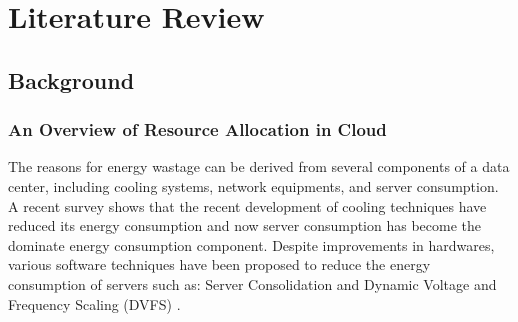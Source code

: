 \chapter{Literature Review}\label{C:background}
\section*{Background}

\subsection*{An Overview of Resource Allocation in Cloud}


The reasons for energy wastage can be derived from several components of a data center, including 
cooling systems, network equipments, and server consumption. 
A recent survey \cite{Cho:2016kz} shows that the recent development of cooling techniques 
have reduced its energy consumption and now 
server consumption has become the dominate energy consumption component.
Despite improvements in hardwares, various software techniques have been proposed 
to reduce the energy consumption of servers 
such as: Server Consolidation and Dynamic Voltage and Frequency Scaling (DVFS) \cite{}.

 

